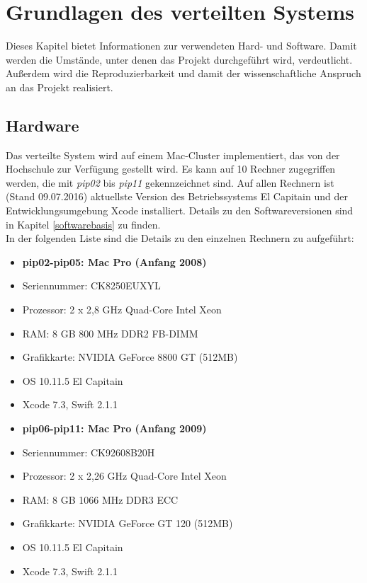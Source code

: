 \chapter{Grundlagen des verteilten Systems}
\label{Grundlagen}
Dieses Kapitel bietet Informationen zur verwendeten Hard- und Software. Damit werden die Umstände, unter denen das Projekt durchgeführt wird, verdeutlicht. Außerdem wird die Reproduzierbarkeit und damit der wissenschaftliche Anspruch an das Projekt realisiert. 

\section{Hardware}
\label{Hardware}
Das verteilte System wird auf einem Mac-Cluster implementiert, das von der Hochschule zur Verfügung gestellt wird. Es kann auf 10 Rechner zugegriffen werden, die mit \emph{pip02} bis \emph{pip11} gekennzeichnet sind. Auf allen Rechnern ist (Stand 09.07.2016) aktuellste Version des Betriebssystems El Capitain und der Entwicklungsumgebung Xcode installiert. Details zu den Softwareversionen sind in Kapitel \ref{softwarebasis} zu finden. \\
In der folgenden Liste sind die Details zu den einzelnen Rechnern zu aufgeführt:

\begin{itemize}
	\item\textbf{pip02-pip05: Mac Pro (Anfang 2008)}
	\item[]Seriennummer: CK8250EUXYL
	\item[]Prozessor: 	2 x 2,8 GHz Quad-Core Intel Xeon 
	\item[]RAM: 8 GB 800 MHz DDR2 FB-DIMM
	\item[]Grafikkarte: 	NVIDIA GeForce 8800 GT (512MB)
	\item[]OS 10.11.5 El Capitain
	\item[]Xcode 7.3, Swift 2.1.1 
	\item\textbf{pip06-pip11: Mac Pro (Anfang 2009)}
	\item[] Seriennummer: CK92608B20H
	\item[]Prozessor: 2 x 2,26 GHz Quad-Core Intel Xeon 
	\item[]RAM: 8 GB 1066 MHz DDR3 ECC
	\item[]Grafikkarte: 	NVIDIA GeForce GT 120 (512MB)
	\item[] OS 10.11.5 El Capitain
	\item[] Xcode 7.3, Swift 2.1.1
	\end{itemize}

